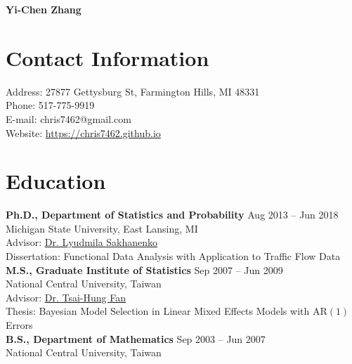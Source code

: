 \documentclass[a4paper,10pt,dvipdfmx]{article}
\begin{document}
\begin{center}
  {\huge \textbf{Yi-Chen Zhang}}
\end{center}

\section*{Contact Information}
\indent Address: 27877 Gettysburg St, Farmington Hills, MI 48331\\
\indent Phone: 517-775-9919\\
\indent E-mail: chris7462@gmail.com\\
\indent Website: \href{https://chris7462.github.io}{https://chris7462.github.io}

\section*{Education}
\indent \textbf{Ph.D., Department of Statistics and Probability} \hfill Aug 2013 -- Jun 2018\\
\indent Michigan State University, East Lansing, MI\\
\indent Advisor: \href{https://www.stt.msu.edu/users/luda/}{Dr. Lyudmila Sakhanenko}\\
\indent Dissertation: Functional Data Analysis with Application to Traffic Flow Data\\

\indent \textbf{M.S., Graduate Institute of Statistics} \hfill Sep 2007 -- Jun 2009\\
\indent National Central University, Taiwan\\
\indent Advisor: \href{http://www.stat.ncu.edu.tw/teacher/THFan/index.htm}{Dr. Tsai-Hung Fan}\\
\indent Thesis: Bayesian Model Selection in Linear Mixed Effects Models with AR$(1)$ Errors\\

\indent \textbf{B.S., Department of Mathematics} \hfill Sep 2003 -- Jun 2007\\
\indent National Central University, Taiwan
\end{document}
